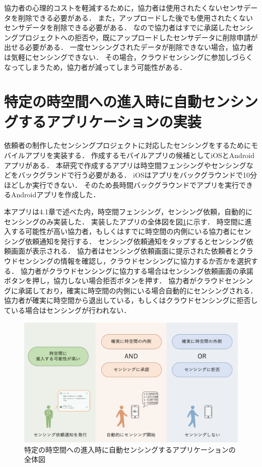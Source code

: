 協力者の心理的コストを軽減するために，協力者は使用されたくないセンサデータを削除できる必要がある．
また，アップロードした後でも使用されたくないセンサデータを削除できる必要がある．
なので協力者はすでに承諾したセンシングプロジェクトへの拒否や，既にアップロードしたセンサデータに削除申請が出せる必要がある．
一度センシングされたデータが削除できない場合，協力者は気軽にセンシングできない．
その場合，クラウドセンシングに参加しづらくなってしまうため，協力者が減ってしまう可能性がある．

\section{特定の時空間への進入時に自動センシングするアプリケーションの実装}
\label{myApp}
依頼者の制作したセンシングプロジェクトに対応したセンシングをするためにモバイルアプリを実装する．
作成するモバイルアプリの候補としてiOSとAndroidアプリがある．
本研究で作成するアプリは時空間フェンシングやセンシングなどをバックグランドで行う必要がある．
iOSはアプリをバックグラウンドで10分ほどしか実行できない．
そのため長時間バックグラウンドでアプリを実行できるAndroidアプリを作成した．

本アプリは4.1章で述べた内，時空間フェンシング，センシング依頼，自動的にセンシングのみ実装した．
実装したアプリの全体図を図\ref{fig:myApp}に示す．
時空間に進入する可能性が高い協力者，もしくはすでに時空間の内側にいる協力者にセンシング依頼通知を発行する．
センシング依頼通知をタップするとセンシング依頼画面が表示される．
協力者はセンシング依頼画面に提示された依頼者とクラウドセンシングの情報を確認し，クラウドセンシングに協力するか否かを選択する．
協力者がクラウドセンシングに協力する場合はセンシング依頼画面の承諾ボタンを押し，協力しない場合拒否ボタンを押す．
協力者がクラウドセンシングに承諾しており，確実に時空間の内側にいる場合自動的にセンシングされる．
協力者が確実に時空間から退出している，もしくはクラウドセンシングに拒否している場合はセンシングが行われない．

\begin{figure}[tbh]
    \centering
    \includegraphics[width=16cm]{img_myApp.png}
    \caption{特定の時空間への進入時に自動センシングするアプリケーションの全体図}
    \label{fig:myApp}
\end{figure}

